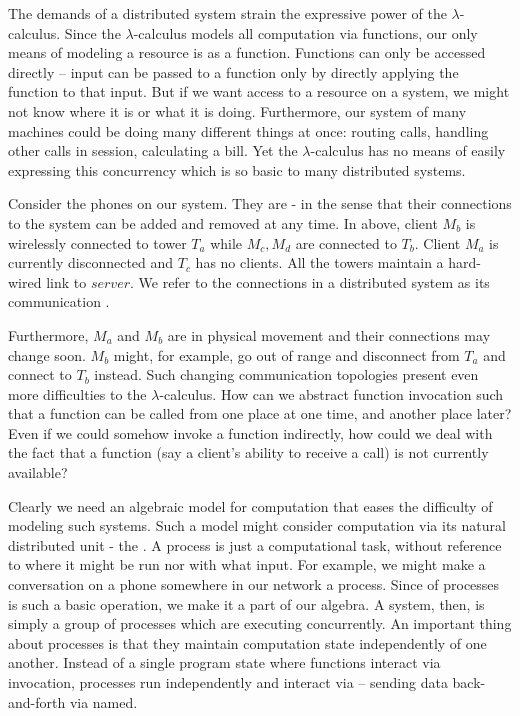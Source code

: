 The demands of a distributed system strain the expressive power of the $\lambda$-calculus.  Since the $\lambda$-calculus models all computation via functions, our only means of modeling a resource is as a function.  Functions can only be accessed directly -- input can be passed to a function only by directly applying the function to that input.  But if we want access to a resource on a system, we might not know where it is or what it is doing.  Furthermore, our system of many machines could be doing many different things at once: routing calls, handling other calls in session, calculating a bill.  Yet the $\lambda$-calculus has no means of easily expressing this concurrency which is so basic to many distributed systems.


Consider the phones on our system.  They are - in the sense that their connections to the system can be added and removed at any time.  In  above, client $M_b$ is wirelessly connected to tower $T_a$ while $M_c,M_d$ are connected to $T_b$.  Client $M_a$ is currently disconnected and $T_c$ has no clients.  All the towers maintain a hard-wired link to $server$.  We refer to the connections in a distributed system as its communication .

Furthermore, $M_a$ and $M_b$ are in physical movement and their connections may change soon.  $M_b$ might, for example, go out of range and disconnect from $T_a$ and connect to $T_b$ instead.  Such changing communication topologies present even more difficulties to the $\lambda$-calculus.  How can we abstract function invocation such that a function can be called from one place at one time, and another place later?  Even if we could somehow invoke a function indirectly, how could we deal with the fact that a function (say a client's ability to receive a call) is not currently available?

Clearly we need an algebraic model for computation that eases the difficulty of modeling such systems.  Such a model might consider computation via its natural distributed unit - the .  A process is just a computational task, without reference to where it might be run nor with what input.  For example, we might make a conversation on a phone somewhere in our network a process. Since  of processes is such a basic operation, we make it a part of our algebra.  A system, then, is simply a group of processes which are executing concurrently. An important thing about processes is that they maintain computation state independently of one another.  Instead of a single program state where functions interact via invocation, processes run independently and interact via  -- sending data back-and-forth via named.  

